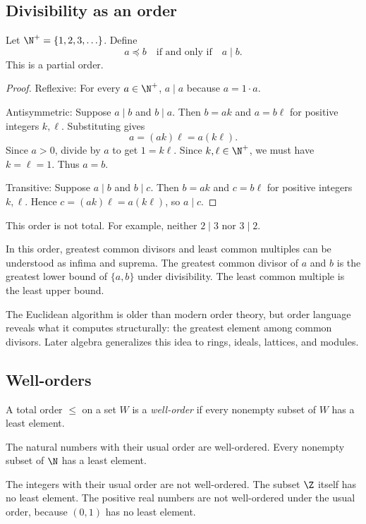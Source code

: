 \subsection{Divisibility as an order}

Let $\N^+=\{1,2,3,\ldots\}$. Define
\[
a\preceq b\quad\text{if and only if}\quad a\mid b.
\]
This is a partial order.

\begin{proof}
Reflexive: For every $a\in\N^+$, $a\mid a$ because $a=1\cdot a$.

Antisymmetric: Suppose $a\mid b$ and $b\mid a$. Then $b=ak$ and $a=b\ell$ for positive integers $k,\ell$. Substituting gives
\[
a=(ak)\ell=a(k\ell).
\]
Since $a>0$, divide by $a$ to get $1=k\ell$. Since $k,\ell\in\N^+$, we must have $k=\ell=1$. Thus $a=b$.

Transitive: Suppose $a\mid b$ and $b\mid c$. Then $b=ak$ and $c=b\ell$ for positive integers $k,\ell$. Hence $c=(ak)\ell=a(k\ell)$, so $a\mid c$.
\end{proof}

This order is not total. For example, neither $2\mid3$ nor $3\mid2$.

In this order, greatest common divisors and least common multiples can be understood as infima and suprema. The greatest common divisor of $a$ and $b$ is the greatest lower bound of $\{a,b\}$ under divisibility. The least common multiple is the least upper bound.

\begin{historybox}
The Euclidean algorithm is older than modern order theory, but order language reveals what it computes structurally: the greatest element among common divisors. Later algebra generalizes this idea to rings, ideals, lattices, and modules.
\end{historybox}

\subsection{Well-orders}

\begin{definition}
A total order $\leq$ on a set $W$ is a \emph{well-order} if every nonempty subset of $W$ has a least element.
\end{definition}

The natural numbers with their usual order are well-ordered. Every nonempty subset of $\N$ has a least element.

The integers with their usual order are not well-ordered. The subset $\Z$ itself has no least element. The positive real numbers are not well-ordered under the usual order, because $(0,1)$ has no least element.

